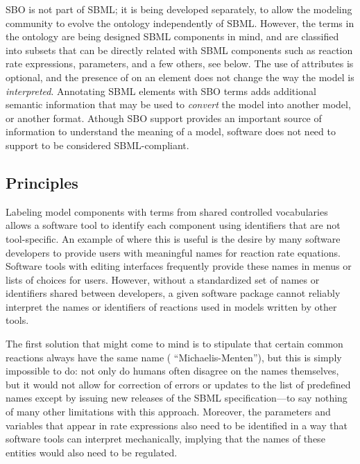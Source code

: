 SBO is not part of SBML; it is being developed separately, to
allow the modeling community to evolve the ontology independently
of SBML.  However, the terms in the ontology are being designed
 SBML components in mind, and are classified into subsets that
can be directly related with SBML components such as reaction rate
expressions, parameters, and a few others, see below.  The use of
 attributes is optional, and the presence of
 on an element does not change the way the model is
\emph{interpreted}.  Annotating SBML elements with SBO terms
adds additional semantic information that may be used to
\emph{convert} the model into another model, or another format.
Athough SBO support provides an important source of information to
understand the meaning of a model, software does not need to
support  to be considered SBML-compliant.

\subsection{Principles}
\label{sec:sbo-principles}

Labeling model components with terms from shared controlled
vocabularies allows a software tool to identify each component using
identifiers that are not tool-specific.  An example of where this
is useful is the desire by many software developers to provide
users with meaningful names for reaction rate equations.  Software
tools with editing interfaces frequently provide these names
in menus or lists of choices for users.  However, without a
standardized set of names or identifiers shared between
developers, a given software package cannot reliably interpret the
names or identifiers of reactions used in models written
by other tools.

The first solution that might come to mind is to stipulate that
certain common reactions always have the same name (\eg
``Michaelis-Menten''), but this is simply impossible to do: not
only do humans often disagree on the names themselves, but it
would not allow for correction of errors or updates to the list of
predefined names except by issuing new releases of the SBML
specification---to say nothing of many other limitations with this
approach.  Moreover, the parameters and variables that appear in
rate expressions also need to be identified in a way that software
tools can interpret mechanically, implying that the names of these
entities would also need to be regulated.

